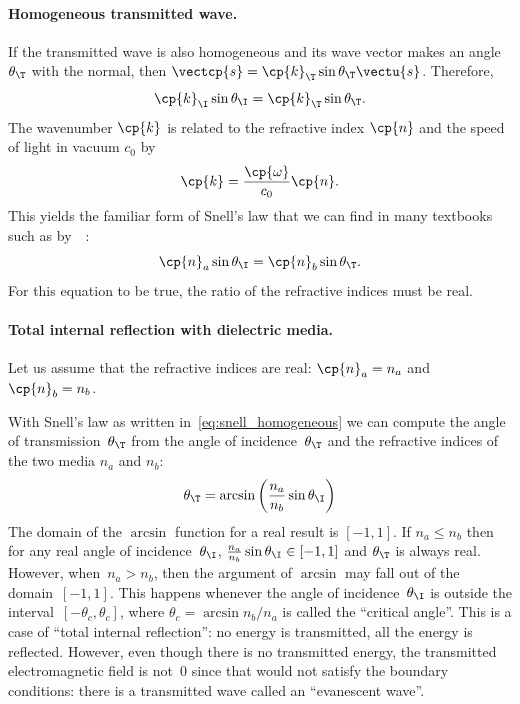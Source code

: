 \paragraph{Homogeneous transmitted wave.}
If the transmitted wave is also homogeneous and its wave vector makes an angle $\theta_\T$ with the normal, then $\vectcp{s} = \cp{k}_\T \sin \theta_\T \vectu{s}$.
Therefore,
\begin{equation}
    \cp{k}_\I \sin \theta_\I = \cp{k}_\T \sin \theta_\T
    \text{.}
\end{equation}
The wavenumber $\cp{k}$ is related
to the refractive index $\cp{n}$
and the speed of light in vacuum $c_0$ by
\begin{equation}
    \cp{k} = \frac{\cp{\omega}}{c_0} \cp{n}
    \text{.}
\end{equation}
This yields the familiar form of Snell's law that we can find in many textbooks such as  by~\citeauthor{hecht2002optics}~\cite{hecht2002optics}:
\begin{equation}
    \cp{n}_a \sin \theta_\I = \cp{n}_b \sin \theta_\T
    \text{.}
    \label{eq:snell_homogeneous}
\end{equation}
For this equation to be true, the ratio of the refractive indices must be real.

\paragraph{Total internal reflection with dielectric media.}
Let us assume that the refractive indices are real: $\cp{n}_a = n_a$ and $\cp{n}_b = n_b$.

With Snell's law as written in~\cref{eq:snell_homogeneous} we can compute the angle of transmission~$\theta_\T$ from the angle of incidence~$\theta_\T$ and the refractive indices of the two media $n_a$ and $n_b$:
\begin{equation}
    \theta_\T = \arcsin
    \left(
        \frac{n_a}{n_b} \sin \theta_\I
    \right)
\end{equation}
The domain of the $\arcsin$ function for a real result is $[-1, 1]$.
If $n_a \leq n_b$ then for any real angle of incidence~$\theta_\I$, $\frac{n_a}{n_b} \sin \theta_\I \in [-1, 1]$ and $\theta_\T$ is always real.
However, when~$n_a > n_b$, then the argument of $\arcsin$ may fall out of the domain~$[-1,1]$.
This happens whenever the angle of incidence~$\theta_\I$ is outside the interval~$[-\theta_c, \theta_c]$, where $\theta_c = \arcsin{n_b / n_a}$ is called the ``critical angle''.
This is a case of ``total internal reflection'': no energy is transmitted, all the energy is reflected.
However, even though there is no transmitted energy, the transmitted electromagnetic field is not~0 since that would not satisfy the boundary conditions:
there is a transmitted wave called an ``evanescent wave''.

